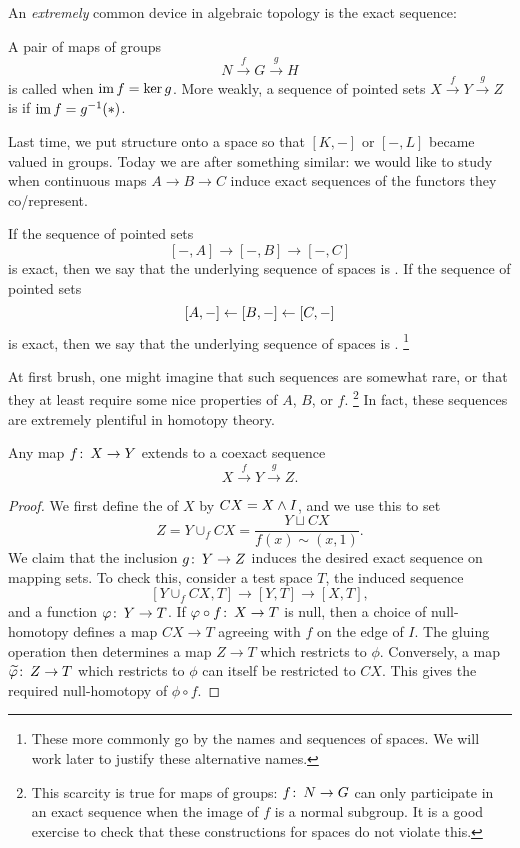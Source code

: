 An \emph{extremely} common device in algebraic topology is the exact sequence:

\begin{definition}
A pair of maps of groups \[N \xrightarrow f G \xrightarrow g H\] is called  when $\operatorname{im} f = \ker g$.
More weakly, a sequence of pointed sets $X \xrightarrow f Y \xrightarrow g Z$ is  if $\operatorname{im} f = g^{-1}(*)$.
\end{definition}

\noindent
Last time, we put structure onto a space so that $[K, -]$ or $[-, L]$ became valued in groups.
Today we are after something similar: we would like to study when continuous maps $A \to B \to C$ induce exact sequences of the functors they co/represent.

\begin{definition}
If the sequence of pointed sets \[[-, A] \to [-, B] \to [-, C]\] is exact, then we say that the underlying sequence of spaces is .
If the sequence of pointed sets \[[A, -] \leftarrow [B, -] \leftarrow [C, -]\] is exact, then we say that the underlying sequence of spaces is .%
\footnote{These more commonly go by the names  and  sequences of spaces.  We will work later to justify these alternative names.}
\end{definition}

At first brush, one might imagine that such sequences are somewhat rare, or that they at least require some nice properties of $A$, $B$, or $f$.%
\footnote{This scarcity is true for maps of groups: $f\colon\thinspace N \to G$ can only participate in an exact sequence when the image of $f$ is a normal subgroup.
It is a good exercise to check that these constructions for spaces do not violate this.}
In fact, these sequences are extremely plentiful in homotopy theory.

\begin{lemma}\label{CoexactSeqsExist}%
Any map $f\colon\thinspace X \to Y$ extends to a coexact sequence \[X \xrightarrow f Y \xrightarrow g Z.\]
\end{lemma}
\begin{proof}
We first define the  of $X$ by $CX = X \wedge I$, and we use this to set \[Z = Y \cup_f CX = \frac{Y \sqcup CX}{f(x) \sim (x, 1)}.\]
We claim that the inclusion $g\colon\thinspace Y \to Z$ induces the desired exact sequence on mapping sets.
To check this, consider a test space $T$, the induced sequence \[[Y \cup_f CX, T] \to [Y, T] \to [X, T],\] and a function $\varphi\colon\thinspace Y \to T$.
If $\varphi \circ f\colon\thinspace X \to T$ is null, then a choice of null-homotopy defines a map $CX \to T$ agreeing with $f$ on the edge of $I$.
The gluing operation then determines a map $Z \to T$ which restricts to $\phi$.
Conversely, a map $\widetilde {\varphi}\colon\thinspace Z \to T$ which restricts to $\phi$ can itself be restricted to $CX$.
This gives the required null-homotopy of $\phi \circ f$.
\end{proof}

